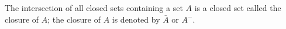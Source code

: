The intersection of all closed sets containing a set $A$ is a closed set called the closure of $A$; the closure of $A$ is denoted by $\bar{A}$ or $A^{-}$.
